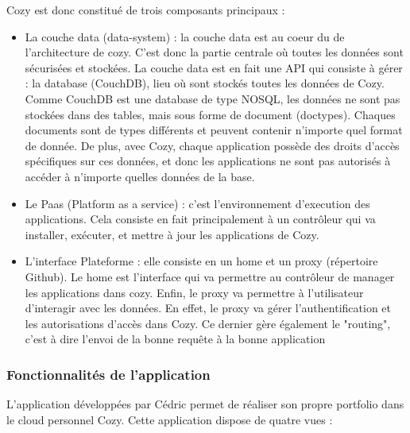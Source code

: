 \newpage

Cozy est donc constitué de trois composants principaux : \\

\begin{itemize}
    \item La couche data (data-system) : la couche data est au coeur du de l'architecture de cozy. C'est donc la partie centrale où toutes les données sont sécurisées et stockées. La couche data est en fait une API qui consiste à gérer : la database (CouchDB), lieu où sont stockés toutes les données de Cozy. Comme CouchDB est une database de type NOSQL, les données ne sont pas stockées dans des tables, mais sous forme de document (doctypes). Chaques documents sont de types différents et peuvent contenir n'importe quel format de donnée. De plus, avec Cozy, chaque application possède des droits d'accès spécifiques sur ces données, et donc les applications ne sont pas autorisés à accéder à n'importe quelles données de la base. \\

    \item Le Paas (Platform as a service) : c'est l'environnement d'execution des applications. Cela consiste en fait principalement à un contrôleur qui va installer, exécuter, et mettre à jour les applications de Cozy. 
    
    \item L'interface Plateforme : elle consiste en un home et un proxy (répertoire Github). Le home est l'interface qui va permettre au contrôleur de manager les applications dans cozy. Enfin, le proxy va permettre à l'utilisateur d'interagir avec les données. En effet, le proxy va gérer l'authentification et les autorisations d'accès dans Cozy. Ce dernier gère également le "routing", c'est à dire l'envoi de la bonne requête à la bonne application
    
    
\end{itemize}

\subsubsection{Fonctionnalités de l'application}

L'application développées par Cédric permet de réaliser son propre portfolio dans le cloud personnel Cozy. Cette application dispose de quatre vues :

